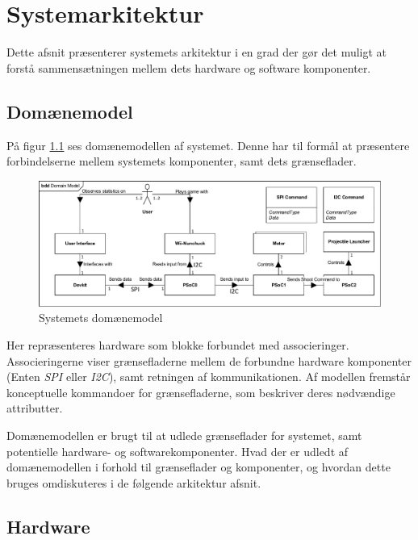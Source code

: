 \chapter{Systemarkitektur}

Dette afsnit præsenterer systemets arkitektur i en grad der gør det muligt at forstå sammensætningen mellem dets hardware og software komponenter.

\section{Domænemodel}

På figur \ref{figure:domainModel} ses domænemodellen af systemet. Denne har til formål at præsentere forbindelserne mellem systemets komponenter, samt dets grænseflader.

\begin{figure}[H]
	\centering
	\includegraphics[width=\textwidth]{SystemArkitektur/images/domainModel}
	\caption{Systemets domænemodel}
	\label{figure:domainModel}
\end{figure}

\noindent Her repræsenteres hardware som blokke forbundet med associeringer. Associeringerne viser grænsefladerne mellem de forbundne hardware komponenter (Enten \textit{SPI} eller \textit{I2C}), samt retningen af kommunikationen. Af modellen fremstår konceptuelle kommandoer for grænsefladerne, som beskriver deres nødvændige attributter. \newline

\noindent Domænemodellen er brugt til at udlede grænseflader for systemet, samt potentielle hardware- og softwarekomponenter. Hvad der er udledt af domænemodellen i forhold til grænseflader og komponenter, og hvordan dette bruges omdiskuteres i de følgende arkitektur afsnit.

\section{Hardware}

